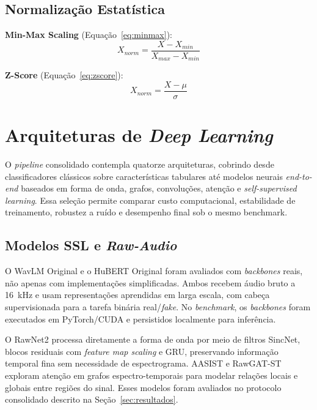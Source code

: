 \documentclass[12pt,a4paper]{article}
\begin{document}
\subsection{Normalização Estatística}

\textbf{Min-Max Scaling} (Equação~\ref{eq:minmax}):
\begin{equation}
\label{eq:minmax}
X_{norm} = \frac{X - X_{min}}{X_{max} - X_{min}}
\end{equation}

\textbf{Z-Score} (Equação~\ref{eq:zscore}):
\begin{equation}
\label{eq:zscore}
X_{norm} = \frac{X - \mu}{\sigma}
\end{equation}

\section{Arquiteturas de \textit{Deep Learning}}
\label{sec:arquiteturas}

O \textit{pipeline} consolidado contempla quatorze arquiteturas, cobrindo desde
classificadores clássicos sobre características tabulares até modelos neurais
\textit{end-to-end} baseados em forma de onda, grafos, convoluções,
atenção e \textit{self-supervised learning}. Essa seleção permite comparar custo
computacional, estabilidade de treinamento, robustez a ruído e desempenho final
sob o mesmo benchmark.

\subsection{Modelos SSL e \textit{Raw-Audio}}

O WavLM Original \cite{chen2022wavlm} e o HuBERT Original
\cite{hsu2021hubert} foram avaliados com \textit{backbones} reais, não apenas
com implementações simplificadas. Ambos recebem áudio bruto a
\SI{16}{\kilo\hertz} e usam representações aprendidas em larga escala, com
cabeça supervisionada para a tarefa binária real/\textit{fake}. No
\textit{benchmark}, os \textit{backbones} foram executados em PyTorch/CUDA e
persistidos localmente para inferência.

O RawNet2 \cite{tak2021rawnet2} processa diretamente a forma de onda por meio
de filtros SincNet, blocos residuais com \textit{feature map scaling} e GRU,
preservando informação temporal fina sem necessidade de espectrograma. AASIST
\cite{jung2022aasist} e RawGAT-ST \cite{tak2021rawgatst} exploram atenção em grafos
espectro-temporais para modelar relações locais e globais entre regiões do
sinal. Esses modelos foram avaliados no protocolo consolidado descrito na
Seção~\ref{sec:resultados}.
\end{document}
